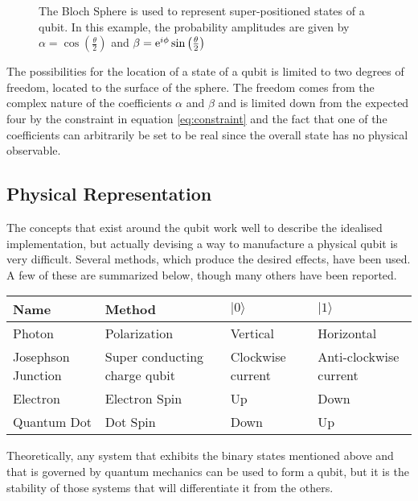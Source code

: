 \begin{figure}
	\centering
	\def\svgwidth{0.5\columnwidth}
	
	\caption{\label{fig:bloch}The Bloch Sphere is used to represent super-positioned states of a qubit. In this example, the probability amplitudes are given by $\alpha = \cos\left(\frac{\theta}{2}\right)$ and $\beta = \text{e}^{i\phi}\sin\left(\frac{\theta}{2}\right)$\cite{blochwiki}}
\end{figure}

The possibilities for the location of a state of a qubit is limited to two degrees of freedom, located to the surface of the sphere. The freedom comes from the complex nature of the coefficients $\alpha$ and $\beta$ and is limited down from the expected four by the constraint in equation \ref{eq:constraint} and the fact that one of the coefficients can arbitrarily be set to be real since the overall state has no physical observable. 

\subsection{Physical Representation} The concepts that exist around the qubit work well to describe the idealised implementation, but actually devising a way to manufacture a physical qubit is very difficult. Several methods, which produce the desired effects, have been used. A few of these are summarized below, though many others have been reported.

\begin{table}
	\begin{tabular}{l|p{3cm}|l|l}
		Name & Method & $|0\rangle$ & $|1\rangle$ \\ \hline\hline
		Photon\cite{PhysRevLett.108.190505} & Polarization & Vertical & Horizontal\\ \hline
		Josephson Junction\cite{barone1982physics} & Super conducting charge qubit & Clockwise current & Anti-clockwise current \\ \hline
		Electron\cite{RevModPhys.79.1217}  & Electron Spin & Up & Down\\ \hline
		Quantum Dot\cite{PhysRevA.57.120} & Dot Spin & Down & Up\\ \hline
	\end{tabular}
\end{table}

Theoretically, any system that exhibits the binary states mentioned above and that is governed by quantum mechanics can be used to form a qubit, but it is the stability of those systems that will differentiate it from the others.

